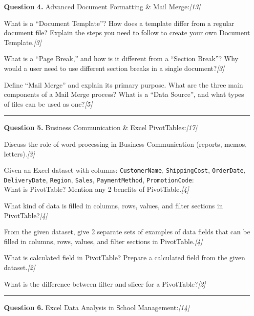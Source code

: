 \documentclass[11pt,a4paper]{article}
\newcommand{\pts}[1]{\hfill   \textit{[#1]}}
\begin{document}
\noindent   \textbf{Question 4.} Advanced Document Formatting \& Mail Merge:\pts{13}

\begin{parts}
  \item What is a ``Document Template''? How does a template differ from a regular document file? Explain the steps you need to follow to create your own Document Template.\pts{3}
  \item What is a ``Page Break,'' and how is it different from a ``Section Break''? Why would a user need to use different section breaks in a single document?\pts{3}
  \item Define ``Mail Merge'' and explain its primary purpose. What are the three main components of a Mail Merge process? What is a ``Data Source'', and what types of files can be used as one?\pts{5}
\end{parts}

\medskip\rule{\linewidth}{0.2pt}




\noindent   \textbf{Question 5.} Business Communication \& Excel PivotTables:\pts{17}

\begin{parts}
  \item Discuss the role of word processing in Business Communication (reports, memos, letters).\pts{3}
  \item Given an Excel dataset with columns:   \texttt{CustomerName},   \texttt{ShippingCost},   \texttt{OrderDate},   \texttt{DeliveryDate},   \texttt{Region},   \texttt{Sales},   \texttt{PaymentMethod},   \texttt{PromotionCode}:\\
  What is PivotTable? Mention any 2 benefits of PivotTable.\pts{4}
  \item What kind of data is filled in columns, rows, values, and filter sections in PivotTable?\pts{4}
  \item From the given dataset, give 2 separate sets of examples of data fields that can be filled in columns, rows, values, and filter sections in PivotTable.\pts{4}
  \item What is calculated field in PivotTable? Prepare a calculated field from the given dataset.\pts{2}
  \item What is the difference between filter and slicer for a PivotTable?\pts{2}
\end{parts}

\medskip\rule{\linewidth}{0.2pt}




\noindent   \textbf{Question 6.} Excel Data Analysis in School Management:\pts{14}
\smallskip
\end{document}

